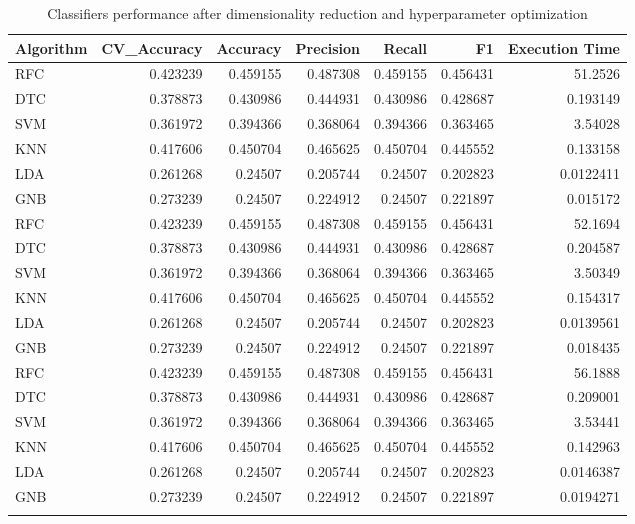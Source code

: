 \documentclass[conference,onecolumn]{IEEEtran}
\begin{document}
    \begin{longtable}{lrrrrrr}
        \hline
         Algorithm   &   CV\_Accuracy &   Accuracy &   Precision &   Recall &       F1 &   Execution Time \\
        \hline
         RFC         &      0.423239 &   0.459155 &    0.487308 & 0.459155 & 0.456431 &       51.2526    \\
         DTC         &      0.378873 &   0.430986 &    0.444931 & 0.430986 & 0.428687 &        0.193149  \\
         SVM         &      0.361972 &   0.394366 &    0.368064 & 0.394366 & 0.363465 &        3.54028   \\
         KNN         &      0.417606 &   0.450704 &    0.465625 & 0.450704 & 0.445552 &        0.133158  \\
         LDA         &      0.261268 &   0.24507  &    0.205744 & 0.24507  & 0.202823 &        0.0122411 \\
         GNB         &      0.273239 &   0.24507  &    0.224912 & 0.24507  & 0.221897 &        0.015172  \\
         RFC         &      0.423239 &   0.459155 &    0.487308 & 0.459155 & 0.456431 &       52.1694    \\
         DTC         &      0.378873 &   0.430986 &    0.444931 & 0.430986 & 0.428687 &        0.204587  \\
         SVM         &      0.361972 &   0.394366 &    0.368064 & 0.394366 & 0.363465 &        3.50349   \\
         KNN         &      0.417606 &   0.450704 &    0.465625 & 0.450704 & 0.445552 &        0.154317  \\
         LDA         &      0.261268 &   0.24507  &    0.205744 & 0.24507  & 0.202823 &        0.0139561 \\
         GNB         &      0.273239 &   0.24507  &    0.224912 & 0.24507  & 0.221897 &        0.018435  \\
         RFC         &      0.423239 &   0.459155 &    0.487308 & 0.459155 & 0.456431 &       56.1888    \\
         DTC         &      0.378873 &   0.430986 &    0.444931 & 0.430986 & 0.428687 &        0.209001  \\
         SVM         &      0.361972 &   0.394366 &    0.368064 & 0.394366 & 0.363465 &        3.53441   \\
         KNN         &      0.417606 &   0.450704 &    0.465625 & 0.450704 & 0.445552 &        0.142963  \\
         LDA         &      0.261268 &   0.24507  &    0.205744 & 0.24507  & 0.202823 &        0.0146387 \\
         GNB         &      0.273239 &   0.24507  &    0.224912 & 0.24507  & 0.221897 &        0.0194271 \\
        \hline
        \caption{Classifiers performance after dimensionality reduction and hyperparameter optimization}
        \label{appdx:classifierPerformanceAfterDimensionalityReductionAndHyperparameterOptimization}
    \end{longtable}
\end{document}

